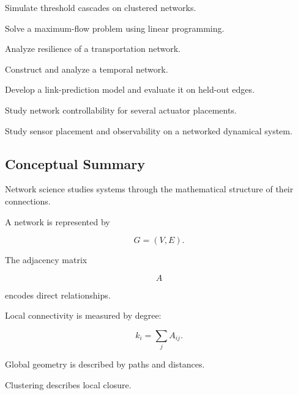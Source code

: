 \begin{exercise}[4]
Simulate threshold cascades on clustered networks.
\end{exercise}

\begin{exercise}[4]
Solve a maximum-flow problem using linear programming.
\end{exercise}

\begin{exercise}[4]
Analyze resilience of a transportation network.
\end{exercise}

\begin{exercise}[4]
Construct and analyze a temporal network.
\end{exercise}

\begin{exercise}[4]
Develop a link-prediction model and evaluate it on held-out edges.
\end{exercise}

\begin{exercise}[4]
Study network controllability for several actuator placements.
\end{exercise}

\begin{exercise}[4]
Study sensor placement and observability on a networked dynamical system.
\end{exercise}

\subsection{Conceptual Summary}
\label{subsec:network-science-summary}

Network science studies systems through the mathematical structure of their
connections.

A network is represented by

\[
\boxed{
G=(V,E).
}
\]

The adjacency matrix

\[
\boxed{
A
}
\]

encodes direct relationships.

Local connectivity is measured by degree:

\[
\boxed{
k_i
=
\sum_jA_{ij}.
}
\]

Global geometry is described by paths and distances.

Clustering describes local closure.

